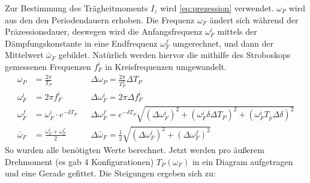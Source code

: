 Zur Bestimmung des Trägheitmoments \(I_z\) wird \cref{eq:prezession} verwendet. \(\omega_P\) wird aus den den Periodendauern erhoben.
Die Frequenz \(\omega_F\) ändert sich während der Präzessionsdauer, deswegen wird die Anfangsfrequenz \(\omega^i_F\) mittels der Dämpfungskonstante in eine Endfrequenz \(\omega^f_F\) umgerechnet, und dann der Mittelwert \(\bar{\omega}_F\) gebildet. Natürlich werden hiervor die mithilfe des Stroboskops gemessenen Frequenzen \(f^i_F\) in Kreisfrequenzen umgewandelt.
\begin{subequations}
\begin{align}
    \omega_P&=\frac{2\pi}{T_P}&&\Delta \omega_P=\frac{2\pi}{T_P^2}\Delta T_P\\
    \omega^i_F&=2\pi f^i_F &&\Delta \omega^i_F=2\pi \Delta f^i_F\\
    \omega^f_F&=\omega^i_F\cdot e^{-\delta T_P}&&\Delta \omega^f_F=e^{-\delta T_P}\sqrt{(\Delta \omega^i_{F})^2 + (\omega^i_{F} \delta \Delta T_P)^2 + (\omega^i_{F} T_p \Delta \delta)^2}\\
    \bar{\omega}_F&=\frac{\omega^i_F+\omega^f_F}{2}&&\Delta\bar{\omega}_F=\frac12 \sqrt{(\Delta \omega^i_F)^2+(\Delta\omega^f_F)^2}
    \end{align}
\end{subequations}
So wurden alle benötigten Werte berechnet. Jetzt werden pro äußerem Drehmoment (es gab 4 Konfigurationen) \(T_P(\omega_F)\) in ein Diagram aufgetragen und eine Gerade gefittet. Die Steigungen ergeben sich zu: 

